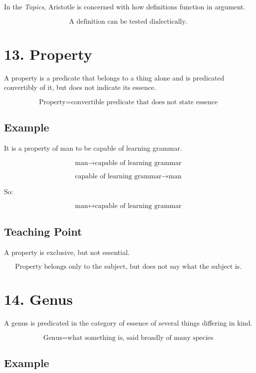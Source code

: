 \documentclass[12pt]{article}
\begin{document}
In the \textit{Topics}, Aristotle is concerned with how definitions function in
argument.

\[
\boxed{
\text{A definition can be tested dialectically.}
}
\]

\section*{13. Property}

A property is a predicate that belongs to a thing alone and is predicated
convertibly of it, but does not indicate its essence.

\[
\boxed{
\text{Property} =
\text{convertible predicate that does not state essence}
}
\]

\subsection*{Example}

It is a property of man to be capable of learning grammar.

\[
\text{man} \rightarrow \text{capable of learning grammar}
\]

\[
\text{capable of learning grammar} \rightarrow \text{man}
\]

So:

\[
\text{man} \leftrightarrow \text{capable of learning grammar}
\]

\subsection*{Teaching Point}

A property is exclusive, but not essential.

\[
\boxed{
\text{Property belongs only to the subject, but does not say what the subject is.}
}
\]

\section*{14. Genus}

A genus is predicated in the category of essence of several things differing in
kind.

\[
\boxed{
\text{Genus} = \text{what something is, said broadly of many species}
}
\]

\subsection*{Example}
\end{document}
